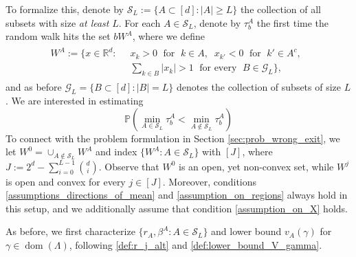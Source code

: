 \documentclass[aap,preprint]{imsart}
\newcommand{\Pro}{{\mathbb{P}}}
\newcommand{\Exp}{{\mathbb{E}}}
\newcommand{\bR}{{\mathbb{R}}}
\theoremstyle{plain}
\theoremstyle{definition}
\begin{document}
To formalize this, denote by $\mathcal{S}_L  :=  
\{A \subset [d]: |A| \geq L\}$ the collection of all subsets with size \textit{at least} $L$. For each $A \in \mathcal{S}_L$, denote by $\tau_b^{A}$ the first time the random walk hits the set $b W^A$, where we define
\begin{align}
\begin{split}
W^{A}  :=  \Big\{x \in \bR^d:\;\;& x_k > 0\; \text{ for } \;k \in A, \;\; x_{k'}< 0\; \text{ for } \;k' \in A^c,  \;\;  \\
&  
 \sum_{k \in B} |x_k| > 1\; \text{ for every } \;B \in \mathcal{G}_L \Big\},
 \end{split}
\label{def:SI_W_A}
\end{align}
and as before  $\mathcal{G}_L = \{B \subset [d]: |B| = L\}$ denotes the collection of subsets of size $L$. We are interested in  estimating
$$\Pro\left( \min_{A \in \mathcal{S}_L} \tau_b^A <  \min_{A \notin \mathcal{S}_L} \tau_b^A \right)$$
To connect with the problem formulation in Section \ref{sec:prob_wrong_exit}, we let
$W^{0} = \cup_{A \not\in \mathcal{S}_L} W^{A}$ 
and index $\{W^{A}: A \in \mathcal{S}_L\}$ with $[J]$, where $J := 2^{d} - \sum_{i=0}^{L-1}\binom{d}{i}$. Observe that $W^{0}$ is an open, yet non-convex set, while  $W^{j}$ is open and convex for every $j \in [J]$.  Moreover, conditions \eqref{assumptions_directions_of_mean} and  \eqref{assumption_on_regions} always hold in this setup, and we additionally assume that condition \eqref{assumption_on_X} holds.

As before, we first characterize $\{r_A, \beta^{A}: A \in \mathcal{S}_L\}$ and lower bound $v_A(\gamma)$ 
for $\gamma \in \operatorname{dom}(\Lambda)$, following  \eqref{def:r_j_alt} and \eqref{def:lower_bound_V_gamma}.
\end{document}
